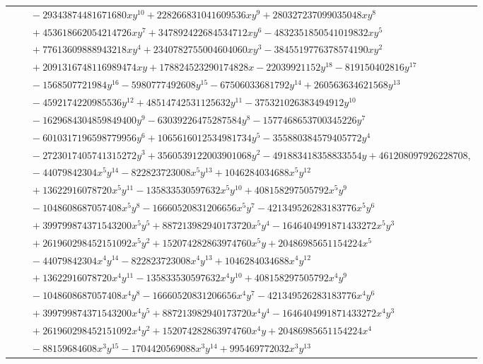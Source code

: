 \documentclass[11pt]{article}
\begin{document}
\begin{longtable}{@{}ll@{}}
 & $\quad -29343874481671680xy^{10}+228266831041609536xy^{9}+280327237099035048xy^{8}$\\
 & $\quad +453618662054214726xy^{7}+347892422684534712xy^{6}-4832351850541019832xy^{5}$\\
 & $\quad +77613609888943218xy^{4}+2340782755004604060xy^{3}-3845519776378574190xy^{2}$\\
 & $\quad +2091316748116989474xy+178824523290174828x-22039921152y^{18}-819150402816y^{17}$\\
 & $\quad -1568507721984y^{16}-5980777492608y^{15}-67506033681792y^{14}+260563634621568y^{13}$\\
 & $\quad -4592174220985536y^{12}+48514742531125632y^{11}-375321026383494912y^{10}$\\
 & $\quad -1629684304859849400y^{9}-63039226475287584y^{8}-1577468653700345226y^{7}$\\
 & $\quad -6010317196598779956y^{6}+1065616012534981734y^{5}-355880384579405772y^{4}$\\
 & $\quad -2723017405741315272y^{3}+3560539122003901068y^{2}-491883418358833554y+461208097926228708,$\\
 & $\quad -44079842304x^{5}y^{14}-822823723008x^{5}y^{13}+1046284034688x^{5}y^{12}$\\
 & $\quad +13622916078720x^{5}y^{11}-135833530597632x^{5}y^{10}+408158297505792x^{5}y^{9}$\\
 & $\quad -1048608687057408x^{5}y^{8}-16660520831206656x^{5}y^{7}-421349526283183776x^{5}y^{6}$\\
 & $\quad +399799874371543200x^{5}y^{5}+887213982940173720x^{5}y^{4}-1646404991871433272x^{5}y^{3}$\\
 & $\quad +261960298452151092x^{5}y^{2}+152074282863974760x^{5}y+20486985651154224x^{5}$\\
 & $\quad -44079842304x^{4}y^{14}-822823723008x^{4}y^{13}+1046284034688x^{4}y^{12}$\\
 & $\quad +13622916078720x^{4}y^{11}-135833530597632x^{4}y^{10}+408158297505792x^{4}y^{9}$\\
 & $\quad -1048608687057408x^{4}y^{8}-16660520831206656x^{4}y^{7}-421349526283183776x^{4}y^{6}$\\
 & $\quad +399799874371543200x^{4}y^{5}+887213982940173720x^{4}y^{4}-1646404991871433272x^{4}y^{3}$\\
 & $\quad +261960298452151092x^{4}y^{2}+152074282863974760x^{4}y+20486985651154224x^{4}$\\
 & $\quad -88159684608x^{3}y^{15}-1704420569088x^{3}y^{14}+995469772032x^{3}y^{13}$\\

\end{longtable}
\end{document}
